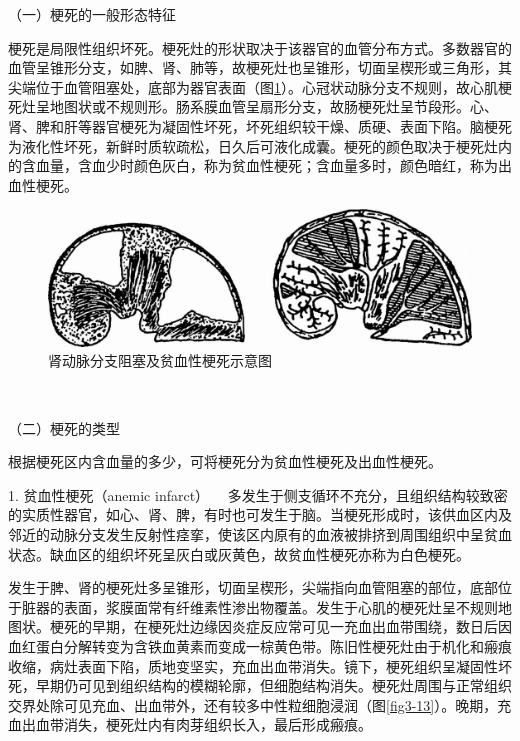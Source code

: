 {（一）梗死的一般形态特征}

梗死是局限性组织坏死。梗死灶的形状取决于该器官的血管分布方式。多数器官的血管呈锥形分支，如脾、肾、肺等，故梗死灶也呈锥形，切面呈楔形或三角形，其尖端位于血管阻塞处，底部为器官表面（图\ref{fig3-12}）。心冠状动脉分支不规则，故心肌梗死灶呈地图状或不规则形。肠系膜血管呈扇形分支，故肠梗死灶呈节段形。心、肾、脾和肝等器官梗死为凝固性坏死，坏死组织较干燥、质硬、表面下陷。脑梗死为液化性坏死，新鲜时质软疏松，日久后可液化成囊。梗死的颜色取决于梗死灶内的含血量，含血少时颜色灰白，称为贫血性梗死；含血量多时，颜色暗红，称为出血性梗死。

\begin{figure}[!htbp]
\centering
\includegraphics{./images/Image00046.jpg}
\caption{肾动脉分支阻塞及贫血性梗死示意图}
\label{fig3-12} 
\end{figure} 　


{（二）梗死的类型}

根据梗死区内含血量的多少，可将梗死分为贫血性梗死及出血性梗死。

{1. 贫血性梗死（anemic infarct）}
　多发生于侧支循环不充分，且组织结构较致密的实质性器官，如心、肾、脾，有时也可发生于脑。当梗死形成时，该供血区内及邻近的动脉分支发生反射性痉挛，使该区内原有的血液被排挤到周围组织中呈贫血状态。缺血区的组织坏死呈灰白或灰黄色，故贫血性梗死亦称为白色梗死。

发生于脾、肾的梗死灶多呈锥形，切面呈楔形，尖端指向血管阻塞的部位，底部位于脏器的表面，浆膜面常有纤维素性渗出物覆盖。发生于心肌的梗死灶呈不规则地图状。梗死的早期，在梗死灶边缘因炎症反应常可见一充血出血带围绕，数日后因血红蛋白分解转变为含铁血黄素而变成一棕黄色带。陈旧性梗死灶由于机化和瘢痕收缩，病灶表面下陷，质地变坚实，充血出血带消失。镜下，梗死组织呈凝固性坏死，早期仍可见到组织结构的模糊轮廓，但细胞结构消失。梗死灶周围与正常组织交界处除可见充血、出血带外，还有较多中性粒细胞浸润（图\ref{fig3-13}）。晚期，充血出血带消失，梗死灶内有肉芽组织长入，最后形成瘢痕。

